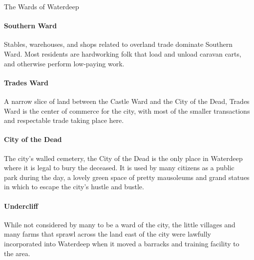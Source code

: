 \documentclass[10pt,a4paper,twoside,twocolumn,openany,bg=print,nodeprecatedcode]{dndbook}
\begin{document}
\begin{DndComment}{The Wards of Waterdeep}
\paragraph{Southern Ward}
Stables, warehouses, and shops related to overland trade dominate Southern Ward. Most residents are hardworking folk that load and unload caravan carts, and otherwise perform low-paying work.
\paragraph{Trades Ward}
A narrow slice of land between the Castle Ward and the City of the Dead, Trades Ward is the center of commerce for the city, with most of the smaller transactions and respectable trade taking place here.
\paragraph{City of the Dead}
The city's walled cemetery, the City of the Dead is the only place in Waterdeep where it is legal to bury the deceased. It is used by many citizens as a public park during the day, a lovely green space of pretty mausoleums and grand statues in which to escape the city's hustle and bustle.
\paragraph{Undercliff}
While not considered by many to be a ward of the city, the little villages and many farms that sprawl across the land east of the city were lawfully incorporated into Waterdeep when it moved a barracks and training facility to the area.
\end{DndComment}
\end{document}
